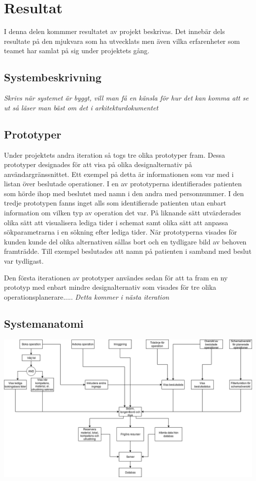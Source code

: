 \chapter{Resultat}
I denna delen kommmer resultatet av projekt beskrivas. Det innebär dels
resultate på den mjukvara som ha utvecklats men även vilka erfarenheter som
teamet har samlat på sig under projektets gång.
\section{Systembeskrivning}
\textit{Skrivs när systemet är byggt, vill man få en känsla för hur det kan
komma att se ut så läser man bäst om det i arkitekturdokumentet}
\section{Prototyper}
Under projektets andra iteration så togs tre olika prototyper fram. Dessa
prototyper designades för att visa på olika designalternativ på
användargränssnittet. Ett exempel på detta är informationen som var med i listan
över beslutade operationer. I en av prototyperna identifierades patienten som hörde
ihop med beslutet med namn i den andra med personnummer. I den tredje prototypen
fanns inget alls som identifierade patienten utan enbart information om vilken
typ av operation det var. På liknande sätt utvärderades olika sätt att
visualisera lediga tider i schemat samt olika sätt att anpassa sökparametrarna i
en sökning efter lediga tider. När prototyperna visades för kunden kunde
del olika alternativen sållas bort och en tydligare bild av behoven framträdde.
Till exempel beslutades att namn på patienten i samband med beslut var tydligast.

Den första iterationen av prototyper användes sedan för att ta fram en ny
prototyp med enbart mindre designalternativ som visades för tre olika
operationsplanerare.....
\textit{Detta kommer i nästa iteration}
\section{Systemanatomi}
\includegraphics[width=\textwidth,height=.7\textheight]{Figures/Systemanatomi.png}\\

